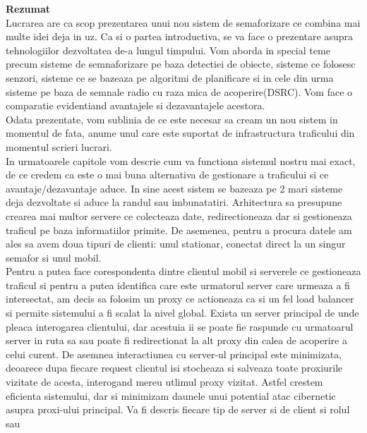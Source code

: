 \documentclass[17pt]{report}
\begin{document}
\pagebreak

{\Large\textbf{Rezumat}} \\

\indent \indent
Lucrarea are ca scop prezentarea unui nou sistem de semaforizare 
ce combina mai multe idei deja in uz. Ca si o partea introductiva,
se va face o prezentare asupra tehnologiilor dezvoltatea de-a lungul 
timpului. Vom aborda in special teme precum sisteme de semnaforizare 
pe baza detectiei de obiecte, sisteme ce folosesc senzori, sisteme ce
se bazeaza pe algoritmi de planificare si in cele din urma sisteme
pe baza de semnale radio cu raza mica de acoperire(DSRC).
Vom face o comparatie evidentiand avantajele si dezavantajele acestora.\\
\indent \indent
Odata prezentate, vom sublinia de ce este necesar sa cream un nou 
sistem in momentul de fata, anume unul care este suportat de 
infrastructura traficului din momentul scrieri lucrari. \\
\indent \indent
In urmatoarele capitole vom descrie cum va functiona sistemul nostru mai
exact, de ce credem ca este o mai buna alternativa de gestionare a
traficului si ce avantaje/dezavantaje aduce. In sine 
acest sistem se bazeaza pe 2 mari sisteme deja dezvoltate si aduce 
la randul sau imbunatatiri. Arhitectura sa presupune crearea mai multor 
servere ce colecteaza date, redirectioneaza dar si gestioneaza traficul pe 
baza informatiilor primite. De asemenea, pentru a procura datele am 
ales sa avem doua tipuri de clienti: unul stationar, conectat direct 
la un singur semafor si unul mobil. \\
\indent \indent
Pentru a putea face corespondenta dintre clientul mobil si serverele 
ce gestioneaza traficul si pentru a putea identifica care este 
urmatorul server care urmeaza a fi intersectat, am decis sa folosim 
un proxy ce actioneaza ca si un fel load balancer si permite
sistemului a fi scalat la nivel global. Exista un server principal
de unde pleaca interogarea clientului, dar acestuia ii se poate fie raspunde cu 
urmatoarul server in ruta sa sau poate fi redirectionat la alt proxy 
din calea de acoperire a celui curent. De asemnea interactiunea cu server-ul
principal este minimizata, deoarece dupa fiecare request clientul isi stocheaza 
si salveaza toate proxiurile vizitate de acesta, interogand mereu utlimul 
proxy vizitat. Astfel crestem eficienta sistemului, 
dar si minimizam daunele unui potential atac cibernetic asupra 
proxi-ului principal. Va fi descris fiecare tip de server si de client si rolul sau 
\end{document}
